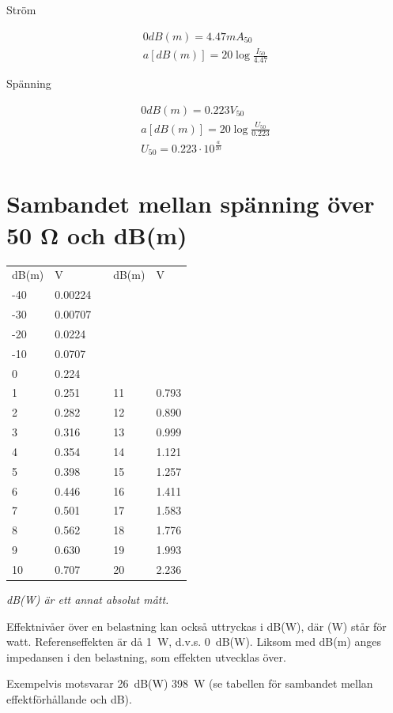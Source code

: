 Ström

\begin{gather*}
  0 dB(m) = 4.47 mA_{50} \\
  a [dB(m)] = 20 \log\frac{I_{50}}{4.47}
\end{gather*}

Spänning

\begin{gather*}
  0 dB(m) = 0.223 V_{50} \\
  a [dB(m)] = 20 \log\frac{U_{50}}{0.223} \\
  U_{50} = 0.223 \cdot 10^{\frac{a}{20}}
\end{gather*}

\section{Sambandet mellan spänning över 50 Ω och dB(m)}
\begin{tabular}{l|lp{1cm}l|l}
  dB(m) & V & & dB(m) & V \\
  \cline{1-2} \cline{4-5}
  -40 & 0.00224 & & & \\
  -30 & 0.00707 & & & \\
  -20 & 0.0224  & & & \\
  -10 & 0.0707  & & & \\
  0   & 0.224   & & & \\
  1   & 0.251   & & 11 & 0.793 \\
  2   & 0.282   & & 12 & 0.890 \\
  3   & 0.316   & & 13 & 0.999 \\
  4   & 0.354   & & 14 & 1.121 \\
  5   & 0.398   & & 15 & 1.257 \\
  6   & 0.446   & & 16 & 1.411 \\
  7   & 0.501   & & 17 & 1.583 \\
  8   & 0.562   & & 18 & 1.776 \\
  9   & 0.630   & & 19 & 1.993 \\
  10  & 0.707   & & 20 & 2.236 \\
\end{tabular}

\emph{dB(W) är ett annat absolut mått.}

Effektnivåer över en belastning kan också uttryckas i dB(W), där (W)
står för watt.  Referenseffekten är då 1~W, d.v.s. 0~dB(W).  Liksom med
dB(m) anges impedansen i den belastning, som effekten utvecklas över.

Exempelvis motsvarar 26~dB(W) 398~W (se tabellen för sambandet mellan
effektförhållande och dB).
